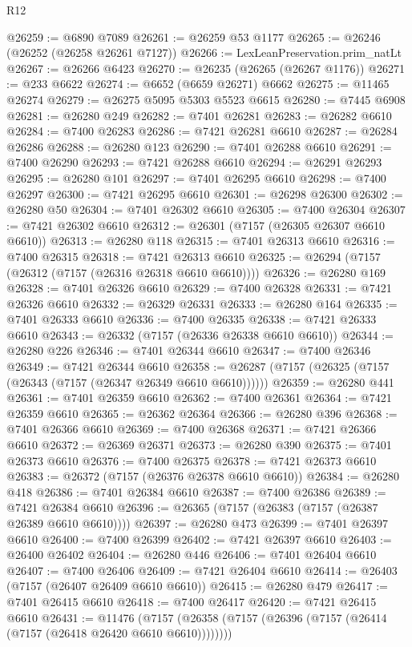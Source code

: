 \begin{lexlean}{R12}
\begin{coremodule}
@26259 := @6890 @7089
@26261 := @26259 @53 @1177
@26265 := @26246 (@26252 (@26258 @26261 @7127))
@26266 := LexLeanPreservation.prim_natLt
@26267 := @26266 @6423
@26270 := @26235 (@26265 (@26267 @1176))
@26271 := @233 @6622
@26274 := @6652 (@6659 @26271) @6662
@26275 := @11465 @26274
@26279 := @26275 @5095 @5303 @5523 @6615
@26280 := @7445 @6908
@26281 := @26280 @249
@26282 := @7401 @26281
@26283 := @26282 @6610
@26284 := @7400 @26283
@26286 := @7421 @26281 @6610
@26287 := @26284 @26286
@26288 := @26280 @123
@26290 := @7401 @26288 @6610
@26291 := @7400 @26290
@26293 := @7421 @26288 @6610
@26294 := @26291 @26293
@26295 := @26280 @101
@26297 := @7401 @26295 @6610
@26298 := @7400 @26297
@26300 := @7421 @26295 @6610
@26301 := @26298 @26300
@26302 := @26280 @50
@26304 := @7401 @26302 @6610
@26305 := @7400 @26304
@26307 := @7421 @26302 @6610
@26312 := @26301 (@7157 (@26305 @26307 @6610 @6610))
@26313 := @26280 @118
@26315 := @7401 @26313 @6610
@26316 := @7400 @26315
@26318 := @7421 @26313 @6610
@26325 := @26294 (@7157 (@26312 (@7157 (@26316 @26318 @6610 @6610))))
@26326 := @26280 @169
@26328 := @7401 @26326 @6610
@26329 := @7400 @26328
@26331 := @7421 @26326 @6610
@26332 := @26329 @26331
@26333 := @26280 @164
@26335 := @7401 @26333 @6610
@26336 := @7400 @26335
@26338 := @7421 @26333 @6610
@26343 := @26332 (@7157 (@26336 @26338 @6610 @6610))
@26344 := @26280 @226
@26346 := @7401 @26344 @6610
@26347 := @7400 @26346
@26349 := @7421 @26344 @6610
@26358 := @26287 (@7157 (@26325 (@7157 (@26343 (@7157 (@26347 @26349 @6610 @6610))))))
@26359 := @26280 @441
@26361 := @7401 @26359 @6610
@26362 := @7400 @26361
@26364 := @7421 @26359 @6610
@26365 := @26362 @26364
@26366 := @26280 @396
@26368 := @7401 @26366 @6610
@26369 := @7400 @26368
@26371 := @7421 @26366 @6610
@26372 := @26369 @26371
@26373 := @26280 @390
@26375 := @7401 @26373 @6610
@26376 := @7400 @26375
@26378 := @7421 @26373 @6610
@26383 := @26372 (@7157 (@26376 @26378 @6610 @6610))
@26384 := @26280 @418
@26386 := @7401 @26384 @6610
@26387 := @7400 @26386
@26389 := @7421 @26384 @6610
@26396 := @26365 (@7157 (@26383 (@7157 (@26387 @26389 @6610 @6610))))
@26397 := @26280 @473
@26399 := @7401 @26397 @6610
@26400 := @7400 @26399
@26402 := @7421 @26397 @6610
@26403 := @26400 @26402
@26404 := @26280 @446
@26406 := @7401 @26404 @6610
@26407 := @7400 @26406
@26409 := @7421 @26404 @6610
@26414 := @26403 (@7157 (@26407 @26409 @6610 @6610))
@26415 := @26280 @479
@26417 := @7401 @26415 @6610
@26418 := @7400 @26417
@26420 := @7421 @26415 @6610
@26431 := @11476
    (@7157 (@26358 (@7157 (@26396 (@7157 (@26414 (@7157 (@26418 @26420 @6610 @6610))))))))

\end{coremodule}
\end{lexlean}
